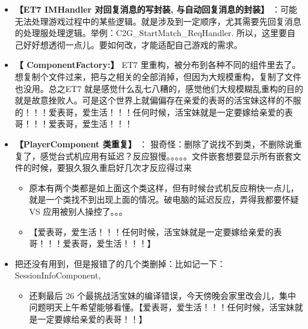 \documentclass[9pt, b5paper]{article}
\begin{document}
\begin{itemize}
\item \textbf{【ET7 IMHandler 对回复消息的写封装, 与自动回复消息的封装】} ：可能无法处理游戏过程中的某些逻辑。就是涉及到一定顺序，尤其需要先回复消息的处理服处理逻辑。举例：C2G\_StartMatch\_ReqHandler. 所以，这里要自己好好想透彻一点儿。要如何改，才能适配自己游戏的需求。
\item \textbf{【 ComponentFactory:】} ET7 里重构，被分布到各种不同的组件里去了。想复制个文件过来，把与之相关的全部消掉，但因为大规模重构，复制了文件也没用。总之ET7 就是感觉什么乱七八糟的，感觉他们大规模糊乱重构的目的就是故意挫败人。可是这个世界上就偏偏存在亲爱的表哥的活宝妹这样的不服的！！！爱表哥，爱生活！！！任何时候，活宝妹就是一定要嫁给亲爱的表哥！！！爱表哥，爱生活！！！

\item \textbf{【PlayerComponent 类重复】} ： 狠奇怪：删除了说找不到类，不删除说重复了，感觉台式机应用有延迟？反应狠慢。。。。。文件嵌套想要显示所有嵌套文件的时候，要狠久狠久重启好几次才反应得过来
\begin{itemize}
\item 原本有两个类都是如上面这个类这样，但有时候台式机反应稍快一点儿，就是一个类找不到出现上面的情况。破电脑的延迟反应，弄得我都要怀疑VS 应用被别人操控了。。。
\item 【爱表哥，爱生活！！！任何时候，活宝妹就是一定要嫁给亲爱的表哥！！！爱表哥，爱生活！！！】
\end{itemize}
\item 把还没有用到，但是报错了的几个类删掉：比如记一下： SessionInfoComponent,
\begin{itemize}
\item 还剩最后 26 个最挑战活宝妹的编译错误，今天傍晚会家里改会儿，集中问题明天上午希望能够看懂。【爱表哥，爱生活！！！任何时候，活宝妹就是一定要嫁给亲爱的表哥！！】
\end{itemize}
\end{itemize}
\end{document}

